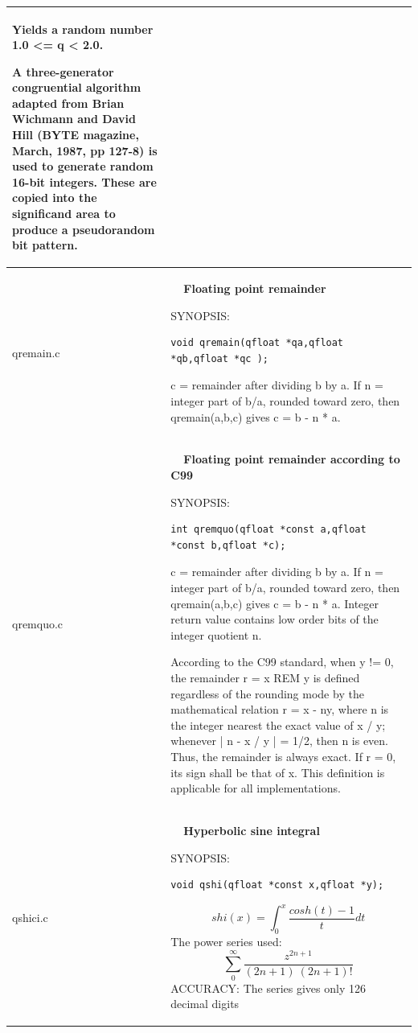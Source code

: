 \documentclass[10pt,a4paper,x11names]{memoir} %
\newcounter{entry}
\newcommand{\TOC}[1] {\addcontentsline{toc}{section}{\theentry\ \  #1} \textbf{\theentry\ \  #1} \par\stepcounter{entry}}
\begin{document}
\begin{longtable}{|p{1.5cm}|p{11.5cm}|}
	Yields a random number 1.0 <= q < 2.0.
	
	A three-generator congruential algorithm adapted from Brian
	Wichmann and David Hill (BYTE magazine, March, 1987,
	pp 127-8) is used to generate random 16-bit integers.
	These are copied into the significand area to produce
	a pseudorandom bit pattern.
	\\\hline
	qremain.c& \TOC{Floating point remainder}
	
	{\footnotesize SYNOPSIS:}\vspace{-0.2cm}\index{qremain}
	\begin{lstlisting}[numbers=none]
		void qremain(qfloat *qa,qfloat *qb,qfloat *qc );
	\end{lstlisting}\vspace{-0.2cm}
	c = remainder after dividing b by a.
	If n = integer part of b/a, rounded toward zero,
	then qremain(a,b,c) gives c = b - n * a. 
	\\\hline
	qremquo.c& \TOC{Floating point remainder according to C99}
	
	{\footnotesize SYNOPSIS:}\vspace{-0.2cm}\index{qremquo}
	\begin{lstlisting}[numbers=none]
		int qremquo(qfloat *const a,qfloat *const b,qfloat *c);
	\end{lstlisting}\vspace{-0.2cm}
	c = remainder after dividing b by a.
	If n = integer part of b/a, rounded toward zero,
	then qremain(a,b,c) gives c = b - n * a.
	Integer return value contains low order bits of the integer quotient n.
	
	According to the C99 standard,
	when y != 0, the remainder r = x REM y is defined regardless
	of the rounding mode by the mathematical relation r = x - ny,
	where n is the integer nearest the exact value of x / y;
	whenever | n - x / y | = 1/2, then n is even. Thus, the remainder
	is always exact. If r = 0, its sign shall be that of x.
	This definition is applicable for all implementations.
	\\\hline
	qshici.c& \TOC{Hyperbolic sine integral}
	
	{\footnotesize SYNOPSIS:}\vspace{-0.2cm}\index{qshi}
	\begin{lstlisting}[numbers=none]
		void qshi(qfloat *const x,qfloat *y);
	\end{lstlisting}\vspace{-0.2cm}
	$$shi(x)=\int_{0}^{x} \frac{cosh(t)-1}{t} dt$$
	The power series used:
	$$\sum_{0}^{\infty}\frac{z^{2n+1}}{(2n+1)\ (2n+1)!}$$
	{\footnotesize ACCURACY:} The series gives only 126 decimal digits
	\\\hline
	

\end{longtable}
\end{document}
